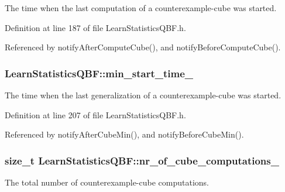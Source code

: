 The time when the last computation of a counterexample-\/cube was started. 



Definition at line 187 of file Learn\-Statistics\-Q\-B\-F.\-h.



Referenced by notify\-After\-Compute\-Cube(), and notify\-Before\-Compute\-Cube().

\hypertarget{classLearnStatisticsQBF_a929ae751d1bbb728f96132e5ee6d99fa}{
\subsubsection[{min\-\_\-start\-\_\-time\-\_\-}]{ Learn\-Statistics\-Q\-B\-F\-::min\-\_\-start\-\_\-time\-\_\-\hspace{0.3cm}{\ttfamily [protected]}}}\label{classLearnStatisticsQBF_a929ae751d1bbb728f96132e5ee6d99fa}


The time when the last generalization of a counterexample-\/cube was started. 



Definition at line 207 of file Learn\-Statistics\-Q\-B\-F.\-h.



Referenced by notify\-After\-Cube\-Min(), and notify\-Before\-Cube\-Min().

\hypertarget{classLearnStatisticsQBF_a857dac1670c551b3dcf935860651143b}{
\subsubsection[{nr\-\_\-of\-\_\-cube\-\_\-computations\-\_\-}]{\setlength{\rightskip}{0pt plus 5cm}size\-\_\-t Learn\-Statistics\-Q\-B\-F\-::nr\-\_\-of\-\_\-cube\-\_\-computations\-\_\-\hspace{0.3cm}{\ttfamily [protected]}}}\label{classLearnStatisticsQBF_a857dac1670c551b3dcf935860651143b}


The total number of counterexample-\/cube computations. 



